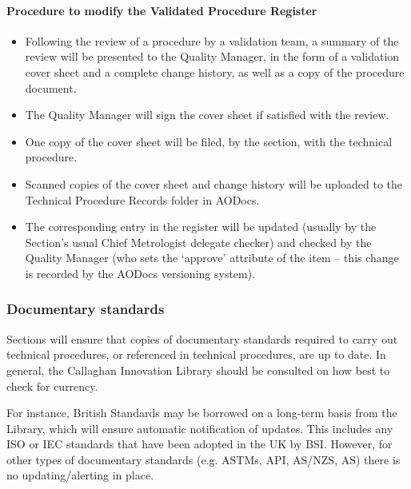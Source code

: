 \paragraph{Procedure to modify the Validated Procedure Register}
\begin{itemize}
\item Following the review of a procedure by a validation team, a summary of the review will be presented to the Quality Manager, in the form of a validation cover sheet and a complete change history, as well as a copy of the procedure document.
\item The Quality Manager will sign the cover sheet if satisfied with the review.
\item One copy of the cover sheet will be filed, by the section, with the technical procedure. 
\item Scanned copies of the cover sheet and change history will be uploaded to the Technical Procedure Records folder in AODocs.
\item The corresponding entry in the register will be updated (usually by the Section's usual Chief Metrologist delegate checker) and checked by the Quality Manager (who sets the ‘approve’ attribute of the item – this change is recorded by the AODocs versioning system).
\end{itemize} 

\subsubsection{Documentary standards}
Sections will ensure that copies of documentary standards required to carry out technical procedures, or referenced in technical procedures, are up to date. 
In general, the Callaghan Innovation Library should be consulted on how best to check for currency.

For instance, British Standards may be borrowed on a long-term basis from the Library, which will ensure automatic notification of updates. This includes any ISO or IEC standards that have been adopted in the UK by BSI. However, for other types of documentary standards (e.g. ASTMs, API, AS/NZS, AS) there is no updating/alerting in place. 